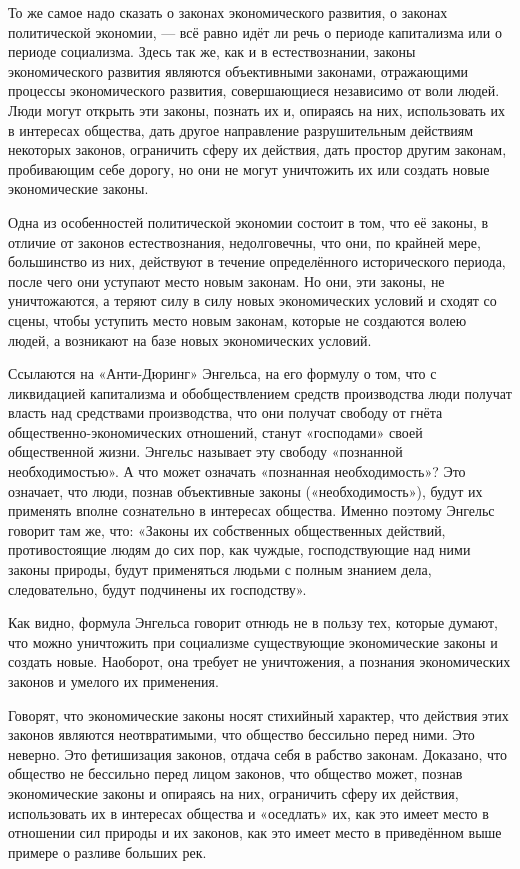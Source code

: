 \documentclass[12pt, a4paper, openany]{book}
\begin{document}
То же самое надо сказать о законах экономического развития, о законах политической экономии, — всё равно идёт ли речь о периоде капитализма или о периоде социализма. Здесь так же, как и в естествознании, законы экономического развития являются объективными законами, отражающими процессы экономического развития, совершающиеся независимо от воли людей. Люди могут открыть эти законы, познать их и, опираясь на них, использовать их в интересах общества, дать другое направление разрушительным действиям некоторых законов, ограничить сферу их действия, дать простор другим законам, пробивающим себе дорогу, но они не могут уничтожить их или создать новые экономические законы.

Одна из особенностей политической экономии состоит в том, что её законы, в отличие от законов естествознания, недолговечны, что они, по крайней мере, большинство из них, действуют в течение определённого исторического периода, после чего они уступают место новым законам. Но они, эти законы, не уничтожаются, а теряют силу в силу новых экономических условий и сходят со сцены, чтобы уступить место новым законам, которые не создаются волею людей, а возникают на базе новых экономических условий.

Ссылаются на «Анти-Дюринг» Энгельса, на его формулу о том, что с ликвидацией капитализма и обобществлением средств производства люди получат власть над средствами производства, что они получат свободу от гнёта общественно-экономических отношений, станут «господами» своей общественной жизни. Энгельс называет эту свободу «познанной необходимостью». А что может означать «познанная необходимость»? Это означает, что люди, познав объективные законы («необходимость»), будут их применять вполне сознательно в интересах общества. Именно поэтому Энгельс говорит там же, что: «Законы их собственных общественных действий, противостоящие людям до сих пор, как чуждые, господствующие над ними законы природы, будут применяться людьми с полным знанием дела, следовательно, будут подчинены их господству».

Как видно, формула Энгельса говорит отнюдь не в пользу тех, которые думают, что можно уничтожить при социализме существующие экономические законы и создать новые. Наоборот, она требует не уничтожения, а познания экономических законов и умелого их применения.

Говорят, что экономические законы носят стихийный характер, что действия этих законов являются неотвратимыми, что общество бессильно перед ними. Это неверно. Это фетишизация законов, отдача себя в рабство законам. Доказано, что общество не бессильно перед лицом законов, что общество может, познав экономические законы и опираясь на них, ограничить сферу их действия, использовать их в интересах общества и «оседлать» их, как это имеет место в отношении сил природы и их законов, как это имеет место в приведённом выше примере о разливе больших рек.
\end{document}
